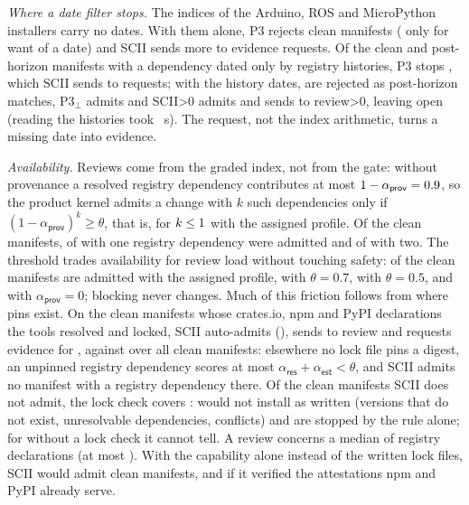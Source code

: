\documentclass[conference]{IEEEtran}
\newcommand{\sres}{\mathsf{res}}
\newcommand{\sest}{\mathsf{est}}
\newcommand{\sprov}{\mathsf{prov}}
\begin{document}
\emph{Where a date filter stops.} The indices of the Arduino, ROS and MicroPython installers carry no dates. With them
alone, P3 rejects \rIdxPThreeCReject{} clean manifests (\rIdxPThreeCRejectAdd{} only for want of a date) and SCII sends
\rIdxSciiCRequestAdd{} more to evidence requests. Of the clean and post-horizon manifests with a dependency dated only
by registry histories, P3 stops \rHistStopped{}, which SCII sends to requests; with the history dates,
\rHistAfterReject{} are rejected as post-horizon matches, P3$_\bot$ admits \rHistAfterPThreeUAdmit{} and
SCII\ifnum\rHistAfterAdmit>0{} admits \rHistAfterAdmit{} and\fi{} sends \rHistAfterReview{} to review\ifnum\rHistAfterRequest>0,
leaving \rHistAfterRequest{} open\fi\ifnum{} (reading the histories took \rHistSeconds~s)\fi.
The request, not the index arithmetic, turns a missing date into evidence.

\emph{Availability.} Reviews come from the graded index, not from the gate: without provenance a resolved registry
dependency contributes at most $1-\alpha_{\sprov}=\rOneMinusProv$, so the product kernel admits a change with $k$ such
dependencies only if $(1-\alpha_{\sprov})^{k}\ge\theta$, that is, for $k\le1$ with the assigned profile. Of the
clean manifests, \rByKOneAdmit{} of \rByKOneN{} with one registry dependency were admitted and \rByKTwoAdmit{} of
\rByKTwoN{} with two. The threshold trades availability for review load without touching safety: \rSensAdmitAssigned{}
of the clean manifests are admitted with the assigned profile, \rSensAdmitThetaSeven{} with $\theta=0.7$,
\rSensAdmitThetaFive{} with $\theta=0.5$, and \rSensAdmitProvZero{} with $\alpha_{\sprov}=0$; blocking never changes.
\ifnum{}
Much of this friction follows from where pins exist. On the \rBuildCleanN{} clean manifests whose crates.io, npm and
PyPI declarations the tools resolved and locked, SCII auto-admits \rBuildCleanAdmit{} (\rBuildCleanAdmitPct), sends
\rBuildCleanReview{} to review and requests evidence for \rBuildCleanRequest, against \rSensAdmitAssigned{} over all
clean manifests\ifnum{}: elsewhere no lock file pins a digest, an unpinned registry dependency scores
at most $\alpha_{\sres}+\alpha_{\sest}<\theta$, and SCII admits no manifest with a registry dependency there\fi.
Of the \rActN{} clean manifests SCII does not admit, the lock check covers \rActCovered: \rActDefect{} would not
install as written (versions that do not exist, unresolvable dependencies, conflicts) and \rActFriction{} are stopped
by the rule alone; for \rActUncovered{} without a lock check it cannot tell. A review concerns a median
of \rRevDepsMedian{} registry declarations (at most \rRevDepsMax). With the capability alone instead of the written
lock files, SCII would admit \rObsPinCAdmit{} clean manifests, and \rProvWhatIfAdmit{} if it verified the attestations
npm and PyPI already serve.
\fi
\end{document}
